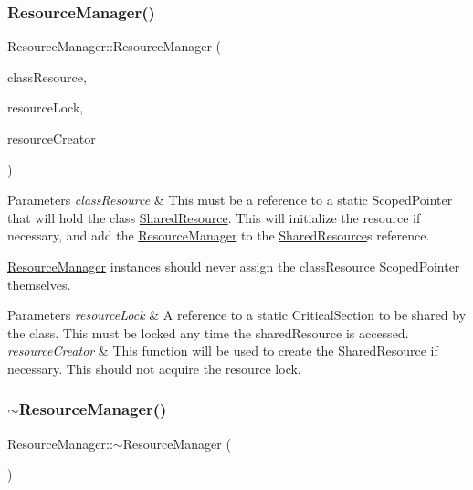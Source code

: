 \subsubsection{\texorpdfstring{Resource\+Manager()}{ResourceManager()}}
{\footnotesize\ttfamily Resource\+Manager\+::\+Resource\+Manager (\begin{DoxyParamCaption}\item[{Scoped\+Pointer$<$ \mbox{\hyperlink{classResourceManager_1_1SharedResource}{Shared\+Resource}} $>$ \&}]{class\+Resource,  }\item[{Critical\+Section \&}]{resource\+Lock,  }\item[{std\+::function$<$ \mbox{\hyperlink{classResourceManager_1_1SharedResource}{Shared\+Resource}} $\ast$()$>$}]{resource\+Creator }\end{DoxyParamCaption})}


\begin{DoxyParams}{Parameters}
{\em class\+Resource} & This must be a reference to a static Scoped\+Pointer that will hold the class \mbox{\hyperlink{classResourceManager_1_1SharedResource}{Shared\+Resource}}. This will initialize the resource if necessary, and add the \mbox{\hyperlink{classResourceManager}{Resource\+Manager}} to the \mbox{\hyperlink{classResourceManager_1_1SharedResource}{Shared\+Resource}}\textquotesingle{}s reference.\\
\hline
\end{DoxyParams}
\mbox{\hyperlink{classResourceManager}{Resource\+Manager}} instances should never assign the class\+Resource Scoped\+Pointer themselves.


\begin{DoxyParams}{Parameters}
{\em resource\+Lock} & A reference to a static Critical\+Section to be shared by the class. This must be locked any time the shared\+Resource is accessed.\\
\hline
{\em resource\+Creator} & This function will be used to create the \mbox{\hyperlink{classResourceManager_1_1SharedResource}{Shared\+Resource}} if necessary. This should not acquire the resource lock. \\
\hline
\end{DoxyParams}
\mbox{\label{classResourceManager_a671c186e4630599e7e36d000c53eaf80}} 
\subsubsection{\texorpdfstring{$\sim$\+Resource\+Manager()}{~ResourceManager()}}
{\footnotesize\ttfamily Resource\+Manager\+::$\sim$\+Resource\+Manager (\begin{DoxyParamCaption}{ }\end{DoxyParamCaption})\hspace{0.3cm}{\ttfamily [virtual]}}


